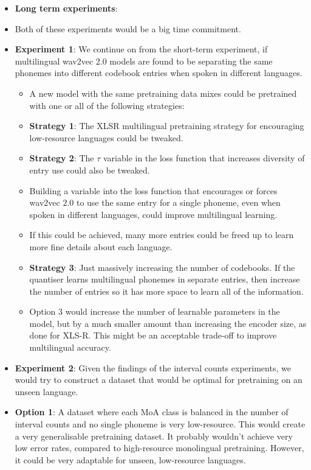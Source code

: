 \begin{itemize}
\begin{itemize}
    \end{itemize}
    \item \textbf{Long term experiments}: %
    \item Both of these experiments would be a big time commitment.
    \item \textbf{Experiment 1}: We continue on from the short-term experiment, if multilingual wav2vec 2.0 models are found to be separating the same phonemes into different codebook entries when spoken in different languages.
    \begin{itemize}
        \item A new model with the same pretraining data mixes could be pretrained with one or all of the following strategies:
        \item \textbf{Strategy 1}: The XLSR multilingual pretraining strategy for encouraging low-resource languages could be tweaked.
        \item \textbf{Strategy 2}: The $\tau$ variable in the loss function that increases diversity of entry use could also be tweaked.
        \item Building a variable into the loss function that encourages or forces wav2vec 2.0 to use the same entry for a single phoneme, even when spoken in different languages, could improve multilingual learning. 
        \item If this could be achieved, many more entries could be freed up to learn more fine details about each language.
        \item \textbf{Strategy 3}: Just massively increasing the number of codebooks. If the quantiser learns multilingual phonemes in separate entries, then increase the number of entries so it has more space to learn all of the information.
        \item Option 3 would increase the number of learnable parameters in the model, but by a much smaller amount than increasing the encoder size, as done for XLS-R. This might be an acceptable trade-off to improve multilingual accuracy.
    \end{itemize}
    \item \textbf{Experiment 2}:  Given the findings of the interval counts experiments, we would try to construct a dataset that would be optimal for pretraining on an unseen language.
    \item \textbf{Option 1}: A dataset where each MoA class is balanced in the number of interval counts and no single phoneme is very low-resource. This would create a very generalisable pretraining dataset. It probably wouldn't achieve very low error rates, compared to high-resource monolingual pretraining. However, it could be very adaptable for unseen, low-resource languages.

\end{itemize}
